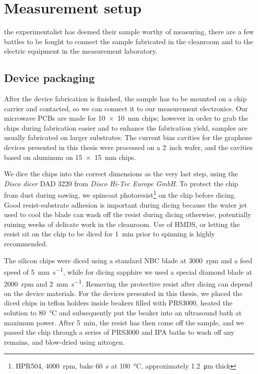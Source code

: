\section{Measurement setup}

 the experimentalist has deemed their sample worthy of measuring, there are a few battles to be fought to connect the sample fabricated in the cleanroom and to the electric equipment in the measurement laboratory.

\subsection{Device packaging}\label{sec:fab-packaging}

% 
After the device fabrication is finished, the sample has to be mounted on a chip carrier and contacted, so we can connect it to our measurement electronics.
% 
Our microwave PCBs are made for \SI{10x10}{\milli\meter} chips; however in order to grab the chips during fabrication easier and to enhance the fabrication yield, samples are usually fabricated on larger substrates:
% 
The current bias cavities for the graphene devices presented in this thesis were processed on a \SI{2}{inch} wafer, and the cavities based on aluminum on \SI{15x15}{\milli\meter} chips.

We dice the chips into the correct dimensions as the very last step, using the \textit{Disco dicer} DAD 3220 from \textit{Disco Hi-Tec Europe GmbH}.
% 
To protect the chip from dust during sawing, we spincoat photoresist\footnote{HPR504, \SI{4000}{rpm}, bake \SI{60}{\second} at \SI{100}{\celsius}, approximately \SI{1.2}{\micro\meter} thick} on the chip before dicing.
% 
Good resist-substrate adhesion is important during dicing because the water jet used to cool the blade can wash off the resist during dicing otherwise, potentially ruining weeks of delicate work in the cleanroom.
% 
Use of HMDS, or letting the resist sit on the chip to be diced for \SI{1}{\minute} prior to spinning is highly recommended.

The silicon chips were diced using a standard NBC blade at \SI{3000}{rpm} and a feed speed of \SI{5}{\milli\meter\per\second}, while for dicing sapphire we used a special diamond blade at \SI{2000}{rpm} and \SI{2}{\milli\meter\per\second}.
% 
Removing the protective resist after dicing can depend on the device materials.
% 
For the devices presented in this thesis, we placed the diced chips in teflon holders inside beakers filled with PRS3000, heated the solution to \SI{80}{\celsius} and subsequently put the beaker into an ultrasound bath at maximum power.
% 
After \SI{5}{\minute}, the resist has then come off the sample, and we passed the chip through a series of PRS3000 and IPA baths to wash off any remains, and blow-dried using nitrogen.

